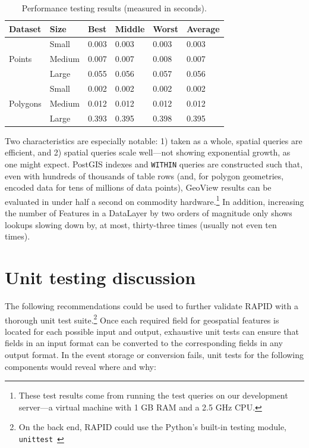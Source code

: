 \begin{table}
\centering
    \begin{tabular}{ |l|l|l|l|l|l| }
        \hline
        Dataset & Size & Best & Middle & Worst & Average\\
        \hline
        \multirow{3}{*}{Points}
         & Small & 0.003 & 0.003 & 0.003 & 0.003 \\ \cline{2-6}
         & Medium & 0.007 & 0.007 & 0.008 & 0.007 \\ \cline{2-6}
         & Large & 0.055 & 0.056 & 0.057 & 0.056 \\ \hline
        \multirow{3}{*}{Polygons}
         & Small & 0.002 & 0.002 & 0.002 & 0.002 \\ \cline{2-6}
        & Medium & 0.012 & 0.012 & 0.012 & 0.012 \\ \cline{2-6}
         & Large & 0.393 & 0.395 & 0.398 & 0.395 \\ \hline
    \end{tabular}
    
    \caption{Performance testing results (measured in seconds).}
    \label{table:tests}
\end{table}

Two characteristics are especially notable: 1) taken as a whole, spatial queries are efficient, and 2) spatial queries scale well---not showing exponential growth, as one might expect. PostGIS indexes and \texttt{WITHIN} queries are constructed such that, even with hundreds of thousands of table rows (and, for polygon geometries, encoded data for tens of millions of data points), GeoView results can be evaluated in under half a second on commodity hardware.\footnote{These test results come from running the test queries on our development server---a virtual machine with 1 GB RAM and a 2.5 GHz CPU.} In addition, increasing the number of Features in a DataLayer by two orders of magnitude only shows lookups slowing down by, at most, thirty-three times (usually not even ten times).


\section{Unit testing discussion}
The following recommendations could be used to further validate RAPID with a thorough unit test suite.\footnote{On the back end, RAPID could use the Python's built-in testing module, \texttt{unittest}~\cite{DjangoTesting}} Once each required field for geospatial features is located for each possible input and output, exhaustive unit tests can ensure that fields in an input format can be converted to the corresponding fields in any output format. In the event storage or conversion fails, unit tests for the following components would reveal where and why:

